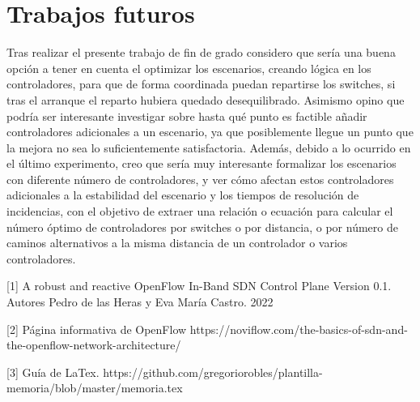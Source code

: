 \documentclass[a4paper, 12pt]{book}
\begin{document}
	
	\section{Trabajos futuros}
	\label{sec:trabajos_futuros}
	
	Tras realizar el presente trabajo de fin de grado considero que sería una buena opción a tener en cuenta el optimizar los escenarios, creando lógica en los controladores, para que de forma coordinada puedan repartirse los switches, si tras el arranque el reparto hubiera quedado desequilibrado. Asimismo opino que podría ser interesante investigar sobre hasta qué punto es factible añadir controladores adicionales a un escenario, ya que posiblemente llegue un punto que la mejora no sea lo suficientemente satisfactoria. 
	Además, debido a lo ocurrido en el último experimento, creo que sería muy interesante formalizar los escenarios con diferente número de controladores, y ver cómo afectan estos controladores adicionales a la estabilidad del escenario y los tiempos de resolución de incidencias, con el objetivo de extraer una relación o ecuación para calcular el número óptimo de controladores por switches o por distancia, o por número de caminos alternativos a la misma distancia de un controlador o varios controladores.
	
	
	
	\cleardoublepage
	
	
	\cleardoublepage
	
	
	 
	
	[1]  A robust and reactive
	OpenFlow In-Band SDN Control Plane
	Version 0.1. Autores Pedro de las Heras y Eva María Castro. 2022
	
	[2]  Página informativa de OpenFlow https://noviflow.com/the-basics-of-sdn-and-the-openflow-network-architecture/ 
		
	[3]  Guía de LaTex.  https://github.com/gregoriorobles/plantilla-memoria/blob/master/memoria.tex
	
\end{document}
